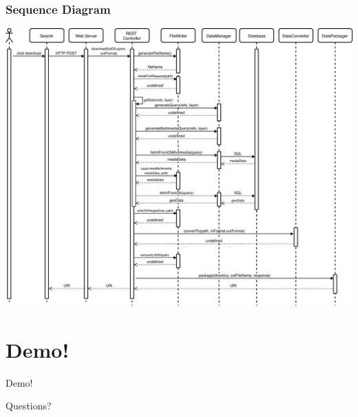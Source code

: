 \documentclass[xcolor=table]{beamer}
\begin{document}
\begin{frame}[plain]
	\frametitle{Sequence Diagram}
	\begin{center}
		\includegraphics[width=0.9\linewidth]{sequence_diagram.pdf}
	\end{center}
\end{frame}
\section{Demo!}
\begin{frame}[plain]
	\Huge{\centerline{Demo!}}
\end{frame}
\begin{frame}[plain]
	\Huge{\centerline{Questions?}}
\end{frame}
\end{document}

